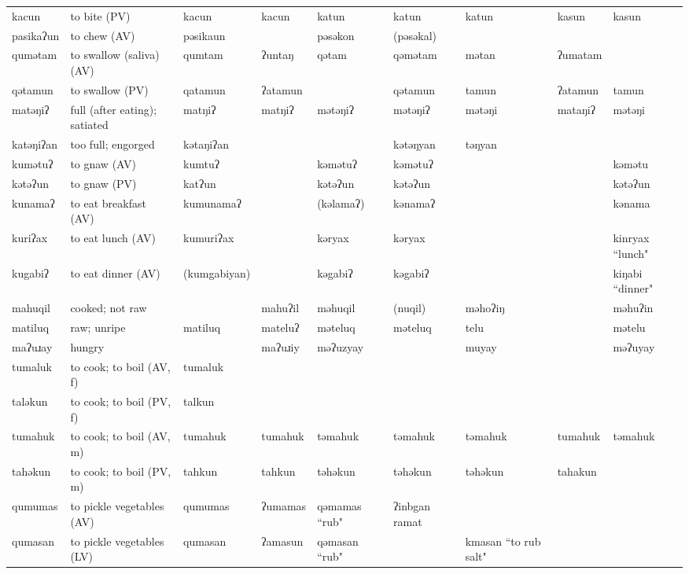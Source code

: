 \begin{landscape}
\begin{longtable}{*{9}{p{}}}
\text{*}kacun & to bite (PV) & kacun & kacun & katun & katun & katun & kasun & kasun\\
\text{*}pasikaʔun & to chew (AV) & pəsikaun &  & pəsəkon & (pəsəkal) &  &  & \\
\text{*}qumətam & to swallow (saliva) (AV) & qumtam & ʔuntaŋ & qətam & qəmətam & mətan & ʔumatam & \\
\text{*}qətamun & to swallow (PV) & qatamun & ʔatamun &  & qətamun & tamun & ʔatamun & tamun\\
\text{*}matəŋiʔ & full (after eating); satiated & matŋiʔ & matŋiʔ & mətəŋiʔ & mətəŋiʔ & mətəŋi & mataŋiʔ & mətəŋi\\
\text{*}katəŋiʔan & too full; engorged & kətaŋiʔan &  &  & kətəŋyan & təŋyan &  & \\
\text{*}kumətuʔ & to gnaw (AV) & kumtuʔ &  & kəmətuʔ & kəmətuʔ &  &  & kəmətu\\
\text{*}kətəʔun & to gnaw (PV) & katʔun &  & kətəʔun & kətəʔun &  &  & kətəʔun\\
\text{*}kunamaʔ & to eat breakfast (AV) & kumunamaʔ &  & (kəlamaʔ) & kənamaʔ &  &  & kənama\\
\text{*}kuriʔax & to eat lunch (AV) & kumuriʔax &  & kəryax & kəryax &  &  & kinryax ``lunch"\\
\text{*}kugabiʔ & to eat dinner (AV) & (kumgabiyan) &  & kəgabiʔ & kəgabiʔ &  &  & kiŋabi ``dinner"\\
\text{*}mahuqil & cooked; not raw &  & mahuʔil & məhuqil & (nuqil) & məhoʔiŋ &  & məhuʔin\\
\text{*}matiluq & raw; unripe & matiluq & mateluʔ & məteluq & məteluq & telu &  & mətelu\\
\text{*}maʔuɹay & hungry &  & maʔuɹiy & məʔuzyay &  & muyay &  & məʔuyay\\
\text{*}tumaluk & to cook; to boil (AV, f) & tumaluk &  &  &  &  &  & \\
\text{*}taləkun & to cook; to boil (PV, f) & talkun &  &  &  &  &  & \\
\text{*}tumahuk & to cook; to boil (AV, m) & tumahuk & tumahuk & təmahuk & təmahuk & təmahuk & tumahuk & təmahuk\\
\text{*}tahəkun & to cook; to boil (PV, m) & tahkun & tahkun & təhəkun & təhəkun & təhəkun & tahakun & \\
\text{*}qumumas & to pickle vegetables (AV) & qumumas & ʔumamas & qəmamas ``rub" & ʔinbgan ramat &  &  & \\
\text{*}qumasan & to pickle vegetables (LV) & qumasan & ʔamasun & qəmasan ``rub" &  & kmasan ``to rub salt" &  & \\

\end{longtable}
\end{landscape}
